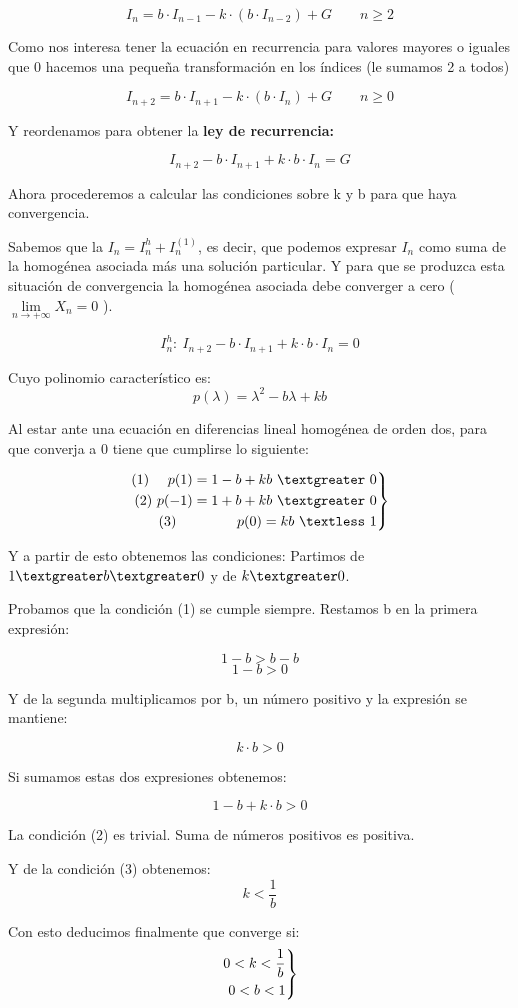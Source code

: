 \documentclass[11pt, a4paper, titlepage]{article}
\theoremstyle{theorem-style}
\theoremstyle{definition-style}
\theoremstyle{remark-style}
\theoremstyle{example-style}
\newenvironment{rcases}
  {\left.\begin{aligned}}
  {\end{aligned}\right\rbrace}
\begin{document}
$$I_n = b\cdot I_{n-1}-k\cdot (b\cdot I_{n-2}) +G\quad \quad n \ge 2$$

Como nos interesa tener la ecuación en recurrencia para valores mayores o iguales que 0 hacemos una pequeña transformación en los índices (le sumamos 2 a todos)

$$I_{n+2} = b\cdot I_{n+1}-k\cdot (b\cdot I_{n}) +G\quad \quad n \ge 0$$

Y reordenamos para obtener la \textbf{ley de recurrencia:}

$$I_{n+2} - b\cdot I_{n+1} + k\cdot b\cdot I_{n} = G$$

\newpage
Ahora procederemos a calcular las condiciones sobre k y b para que haya convergencia.

Sabemos que la $I_n = I_n^h+I_n^{(1)}$, es decir, que podemos expresar $I_n$ como suma de la homogénea asociada más una solución particular. Y para que se produzca esta situación de convergencia la homogénea asociada debe converger a cero ( $\lim \limits_{n \to +\infty} X_n = 0 $ ).

$$I_n^h:\ I_{n+2} - b\cdot I_{n+1} + k\cdot b\cdot I_{n} = 0 $$

Cuyo polinomio característico es:
$$p(\lambda) = \lambda^2 - b\lambda + kb$$

Al estar ante una ecuación en diferencias lineal homogénea de orden dos, para que converja a 0 tiene que cumplirse lo siguiente:

\[
\begin{rcases}
 (1)\ \quad p(1) = 1-b + kb\ \textgreater\ 0\\
 (2)\ p(-1) = 1+b + kb\ \textgreater\ 0\\
 (3)\ \quad\quad \quad\quad p(0) = kb\ \textless\ 1\\
\end{rcases}
\]

Y a partir de esto obtenemos las condiciones:
Partimos de $1 \textgreater b \textgreater 0$ y de $k\textgreater 0$.

Probamos que la condición (1) se cumple siempre.
Restamos b  en la primera expresión:

$$1-b > b-b$$
$$1-b > 0$$

Y de la segunda multiplicamos por b, un número positivo y la expresión se mantiene:

$$k\cdot b > 0$$

Si sumamos estas dos expresiones obtenemos:

$$1-b +k\cdot b > 0$$

La condición (2) es trivial. Suma de números positivos es positiva.

Y de la condición (3) obtenemos:
$$k < \frac{1}{b}$$ 

Con esto deducimos finalmente que converge si:
\[
\begin{rcases}
	0 < k < \frac{1}{b}\\
	0 < b < 1
\end{rcases}
\]
\end{document}

